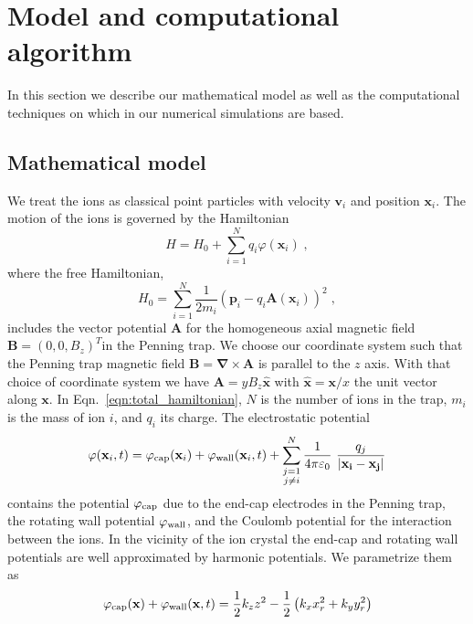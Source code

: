\documentclass[aps, pra, preprint]{revtex4-1}
\newcommand{\hzero}{H_0}
\newcommand{\phicap}{\varphi_{\rm cap}}
\newcommand{\phiwall}{\varphi_{\rm wall}}
\begin{document}
\section{Model and computational algorithm}
\label{sec:model}

In this section we describe our mathematical model as well as the
computational techniques on which in our numerical simulations
are based.


\subsection{Mathematical model}

We treat the ions as classical point particles with 
velocity $\mathbf{v}_i$ and position $\mathbf{x}_i$. The motion
of the ions is governed by the Hamiltonian
\begin{equation}
  H = \hzero + \sum_{i=1}^N q_i\varphi(\mathbf{x}_i)\;,
\end{equation}
where the free Hamiltonian,
\begin{equation}
  \hzero =
  \sum_{i=1}^N \frac{1}{2m_i}\left(
    \mathbf{p}_i -
    q_i\mathbf{A}(\mathbf{x}_i) \right)^2 \;,
  \label{eqn:total_hamiltonian}
\end{equation}
includes the vector potential $\mathbf{A}$ for the homogeneous
axial magnetic field $\mathbf{B}=(0, 0, B_z)^T$in the Penning
trap. We choose our coordinate system such that the Penning trap
magnetic field $\mathbf{B} = \mathbf{\nabla}\times \mathbf{A}$ is
parallel to the $z$ axis. With that choice of coordinate system
we have $\mathbf{A} = yB_z\mathbf{\hat x}$ with $\mathbf{\hat
  x}=\mathbf{x}/x$ the unit vector along $\mathbf{x}$. In
Eqn.~\eqref{eqn:total_hamiltonian}, $N$ is the number of ions in
the trap, $m_i$ is the mass of ion $i$, and $q_i$ its charge. The
electrostatic potential
\begin{equation}
  \varphi(\mathbf{x}_i, t) =
  \phicap(\mathbf{x}_i) +
  \phiwall(\mathbf{x}_i, t) +
  \sum_{\substack{j=1\\j\neq i}}^N
  \frac{1}{4\pi\varepsilon_0}\
  \frac{q_j}{\left| \mathbf{x_i} - \mathbf{x_j} \right|}
\end{equation}
contains the potential $\phicap$ due to the end-cap electrodes in
the Penning trap, the rotating wall potential $\phiwall$, and the
Coulomb potential for the interaction between the ions. In the
vicinity of the ion crystal the end-cap and rotating wall
potentials are well approximated by harmonic potentials. We
parametrize them as
\begin{equation}
  \phicap(\mathbf{x}) +\phiwall(\mathbf{x}, t) =\frac{1}{2}k_z z^2 - 
\frac{1}{2} \left(k_x x_r^2 + k_y y_r^2\right)
\end{equation}
\end{document}
